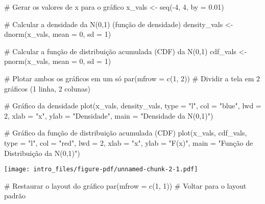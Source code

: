 \documentclass[
  letterpaper,
  DIV=11,
  numbers=noendperiod]{scrreprt}
\newenvironment{Shaded}{\begin{snugshade}}{\end{snugshade}}
\newcommand{\AttributeTok}[1]{\textcolor[rgb]{0.40,0.45,0.13}{#1}}
\newcommand{\CommentTok}[1]{\textcolor[rgb]{0.37,0.37,0.37}{#1}}
\newcommand{\DecValTok}[1]{\textcolor[rgb]{0.68,0.00,0.00}{#1}}
\newcommand{\FloatTok}[1]{\textcolor[rgb]{0.68,0.00,0.00}{#1}}
\newcommand{\FunctionTok}[1]{\textcolor[rgb]{0.28,0.35,0.67}{#1}}
\newcommand{\NormalTok}[1]{\textcolor[rgb]{0.00,0.23,0.31}{#1}}
\newcommand{\OtherTok}[1]{\textcolor[rgb]{0.00,0.23,0.31}{#1}}
\newcommand{\SpecialCharTok}[1]{\textcolor[rgb]{0.37,0.37,0.37}{#1}}
\newcommand{\StringTok}[1]{\textcolor[rgb]{0.13,0.47,0.30}{#1}}
\begin{document}
\begin{Shaded}
\begin{Highlighting}[]
\CommentTok{\# Gerar os valores de x para o gráfico}
\NormalTok{x\_vals }\OtherTok{\textless{}{-}} \FunctionTok{seq}\NormalTok{(}\SpecialCharTok{{-}}\DecValTok{4}\NormalTok{, }\DecValTok{4}\NormalTok{, }\AttributeTok{by =} \FloatTok{0.01}\NormalTok{)}

\CommentTok{\# Calcular a densidade da N(0,1) (função de densidade)}
\NormalTok{density\_vals }\OtherTok{\textless{}{-}} \FunctionTok{dnorm}\NormalTok{(x\_vals, }\AttributeTok{mean =} \DecValTok{0}\NormalTok{, }\AttributeTok{sd =} \DecValTok{1}\NormalTok{)}

\CommentTok{\# Calcular a função de distribuição acumulada (CDF) da N(0,1)}
\NormalTok{cdf\_vals }\OtherTok{\textless{}{-}} \FunctionTok{pnorm}\NormalTok{(x\_vals, }\AttributeTok{mean =} \DecValTok{0}\NormalTok{, }\AttributeTok{sd =} \DecValTok{1}\NormalTok{)}

\CommentTok{\# Plotar ambos os gráficos em um só}
\FunctionTok{par}\NormalTok{(}\AttributeTok{mfrow =} \FunctionTok{c}\NormalTok{(}\DecValTok{1}\NormalTok{, }\DecValTok{2}\NormalTok{))  }\CommentTok{\# Dividir a tela em 2 gráficos (1 linha, 2 colunas)}

\CommentTok{\# Gráfico da densidade}
\FunctionTok{plot}\NormalTok{(x\_vals, density\_vals, }\AttributeTok{type =} \StringTok{"l"}\NormalTok{, }\AttributeTok{col =} \StringTok{"blue"}\NormalTok{, }\AttributeTok{lwd =} \DecValTok{2}\NormalTok{,}
     \AttributeTok{xlab =} \StringTok{"x"}\NormalTok{, }\AttributeTok{ylab =} \StringTok{"Densidade"}\NormalTok{, }\AttributeTok{main =} \StringTok{"Densidade da N(0,1)"}\NormalTok{)}

\CommentTok{\# Gráfico da função de distribuição acumulada (CDF)}
\FunctionTok{plot}\NormalTok{(x\_vals, cdf\_vals, }\AttributeTok{type =} \StringTok{"l"}\NormalTok{, }\AttributeTok{col =} \StringTok{"red"}\NormalTok{, }\AttributeTok{lwd =} \DecValTok{2}\NormalTok{,}
     \AttributeTok{xlab =} \StringTok{"x"}\NormalTok{, }\AttributeTok{ylab =} \StringTok{"F(x)"}\NormalTok{, }\AttributeTok{main =} \StringTok{"Função de Distribuição da N(0,1)"}\NormalTok{)}
\end{Highlighting}
\end{Shaded}

\texttt{[image: intro\_files/figure-pdf/unnamed-chunk-2-1.pdf]}

\begin{Shaded}
\begin{Highlighting}[]
\CommentTok{\# Restaurar o layout do gráfico}
\FunctionTok{par}\NormalTok{(}\AttributeTok{mfrow =} \FunctionTok{c}\NormalTok{(}\DecValTok{1}\NormalTok{, }\DecValTok{1}\NormalTok{))  }\CommentTok{\# Voltar para o layout padrão}
\end{Highlighting}
\end{Shaded}
\end{document}
